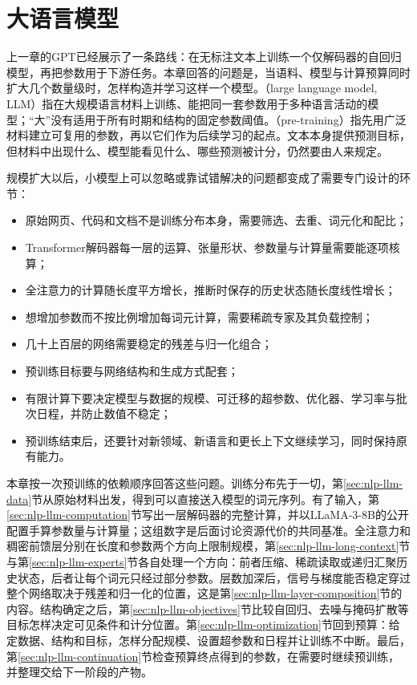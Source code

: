 \chapter{大语言模型}
\label{chap:nlp-large-language-models}

上一章的GPT已经展示了一条路线：在无标注文本上训练一个仅解码器的自回归模型，再把参数用于下游任务。本章回答的问题是，当语料、模型与计算预算同时扩大几个数量级时，怎样构造并学习这样一个模型。（large language model, LLM）指在大规模语言材料上训练、能把同一套参数用于多种语言活动的模型；“大”没有适用于所有时期和结构的固定参数阈值。（pre-training）指先用广泛材料建立可复用的参数，再以它们作为后续学习的起点。文本本身提供预测目标，但材料中出现什么、模型能看见什么、哪些预测被计分，仍然要由人来规定。

规模扩大以后，小模型上可以忽略或靠试错解决的问题都变成了需要专门设计的环节：

\begin{itemize}
  \item 原始网页、代码和文档不是训练分布本身，需要筛选、去重、词元化和配比；
  \item Transformer解码器每一层的运算、张量形状、参数量与计算量需要能逐项核算；
  \item 全注意力的计算随长度平方增长，推断时保存的历史状态随长度线性增长；
  \item 想增加参数而不按比例增加每词元计算，需要稀疏专家及其负载控制；
  \item 几十上百层的网络需要稳定的残差与归一化组合；
  \item 预训练目标要与网络结构和生成方式配套；
  \item 有限计算下要决定模型与数据的规模、可迁移的超参数、优化器、学习率与批次日程，并防止数值不稳定；
  \item 预训练结束后，还要针对新领域、新语言和更长上下文继续学习，同时保持原有能力。
\end{itemize}

本章按一次预训练的依赖顺序回答这些问题。训练分布先于一切，第\ref{sec:nlp-llm-data}节从原始材料出发，得到可以直接送入模型的词元序列。有了输入，第\ref{sec:nlp-llm-computation}节写出一层解码器的完整计算，并以LLaMA-3-8B的公开配置手算参数量与计算量；这组数字是后面讨论资源代价的共同基准。全注意力和稠密前馈层分别在长度和参数两个方向上限制规模，第\ref{sec:nlp-llm-long-context}节与第\ref{sec:nlp-llm-experts}节各自处理一个方向：前者压缩、稀疏读取或递归汇聚历史状态，后者让每个词元只经过部分参数。层数加深后，信号与梯度能否稳定穿过整个网络取决于残差和归一化的位置，这是第\ref{sec:nlp-llm-layer-composition}节的内容。结构确定之后，第\ref{sec:nlp-llm-objectives}节比较自回归、去噪与掩码扩散等目标怎样决定可见条件和计分位置。第\ref{sec:nlp-llm-optimization}节回到预算：给定数据、结构和目标，怎样分配规模、设置超参数和日程并让训练不中断。最后，第\ref{sec:nlp-llm-continuation}节检查预算终点得到的参数，在需要时继续预训练，并整理交给下一阶段的产物。

